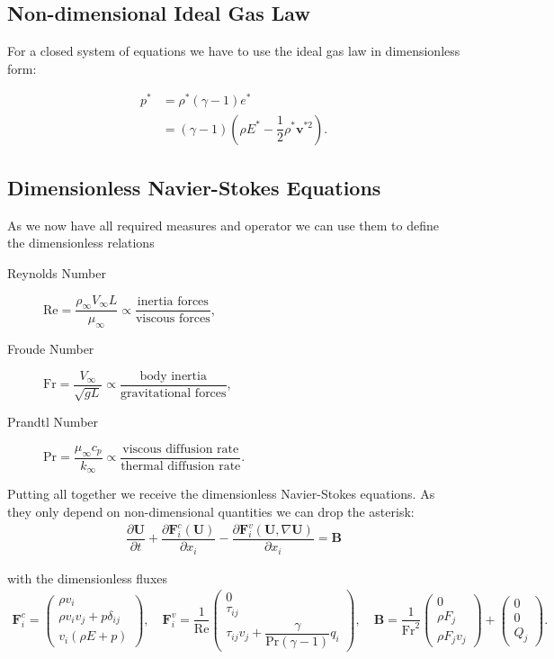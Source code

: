 		
	\subsection{Non-dimensional Ideal Gas Law}
	For a closed system of equations we have to use the ideal gas law in dimensionless form: 
	
	\begin{align}
		p^* &= \rho^* (\gamma - 1) e^* \\
		&= (\gamma - 1) \left(\rho E^* - \dfrac{1}{2} \rho^* \mathbf{v}^{*2}\right) .
	\end{align}	
	
	\subsection{Dimensionless Navier-Stokes Equations}
	As we now have all required measures and operator we can use them to define the dimensionless relations 
	\begin{description}
		\item[Reynolds Number] $\text{Re} = \dfrac{\rho_\infty V_\infty L}{\mu_\infty} \propto \dfrac{\text{inertia forces}}{\text{viscous forces}}$,
		\item[Froude Number] \quad $\text{Fr} = \dfrac{V_\infty }{\sqrt{g L}} \propto \dfrac{\text{body inertia}}{\text{gravitational forces}}$,
		\item[Prandtl Number]\quad $\text{Pr} = \dfrac{ \mu_\infty c_p}{k_\infty} \propto \dfrac{\text{viscous diffusion rate}}{\text{thermal diffusion rate}}$.
	\end{description}
	Putting all together we receive the dimensionless Navier-Stokes equations. As they only depend on non-dimensional quantities we can drop the asterisk:
	\begin{align}
		\dfrac{\partial \mathbf{U}}{\partial t} + \dfrac{\partial \mathbf{F}_i^c(\mathbf{U})}{\partial x_i} - \dfrac{\partial \mathbf{F}_i^v(\mathbf{U}, \nabla\mathbf{U})}{\partial x_i} = \mathbf{B}
	\end{align}
	
	with the dimensionless fluxes
	\begin{align}
		\mathbf{F}_i^c = 
		\begin{pmatrix}
			\rho v_i \\
			\rho v_i v_j + p \delta_{ij}\\
			v_i(\rho E + p)
		\end{pmatrix} , \quad
		\mathbf{F}_i^v = \dfrac{1}{\text{Re}}
		\begin{pmatrix}
			0 \\
			\tau_{ij}\\
			\tau_{ij}v_j + \dfrac{\gamma}{\text{Pr}(\gamma-1)} q_i
		\end{pmatrix} , \quad
		\mathbf{B} = \dfrac{1}{\text{Fr}^2}
		\begin{pmatrix}
			0 \\
			\rho F_j\\
			\rho F_j v_j
		\end{pmatrix}
		+ 
		\begin{pmatrix}
			0 \\
			0\\
			Q_j
		\end{pmatrix}
		.
	\end{align}	
	